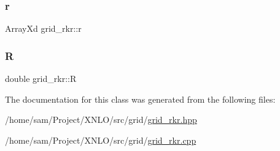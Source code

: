 \subsubsection{\texorpdfstring{r}{r}}
{\footnotesize\ttfamily Array\+Xd grid\+\_\+rkr\+::r}

\mbox{\label{classgrid__rkr_a2da8ae00c520a66c9cac2784a2149dcb}} 
\subsubsection{\texorpdfstring{R}{R}}
{\footnotesize\ttfamily double grid\+\_\+rkr\+::R}



The documentation for this class was generated from the following files\+:\begin{DoxyCompactItemize}
\item 
/home/sam/\+Project/\+X\+N\+L\+O/src/grid/\hyperlink{grid__rkr_8hpp}{grid\+\_\+rkr.\+hpp}\item 
/home/sam/\+Project/\+X\+N\+L\+O/src/grid/\hyperlink{grid__rkr_8cpp}{grid\+\_\+rkr.\+cpp}\end{DoxyCompactItemize}
